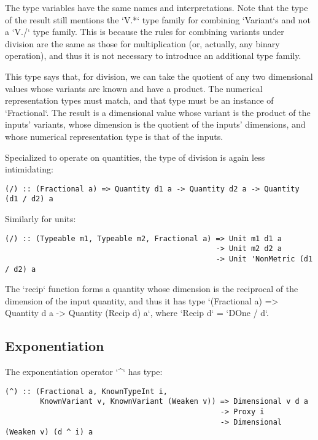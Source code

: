 \documentclass[11pt]{report}
\begin{document}
The type variables have the same names and interpretations. Note that the type of the result still mentions the
`V.*` type family for combining `Variant`s and not a `V./` type family. This is because the rules for combining variants
under division are the same as those for multiplication (or, actually, any binary operation), and thus it is not necessary
to introduce an additional type family.

This type says that, for division, we can take the quotient of any two dimensional values whose variants are known and have a product.
The numerical representation types must match, and that type must be an instance of `Fractional`. The result is a dimensional value
whose variant is the product of the inputs' variants, whose dimension is the quotient of the inputs' dimensions, and whose numerical representation
type is that of the inputs.

Specialized to operate on quantities, the type of division is again less intimidating:

\begin{lstlisting}
(/) :: (Fractional a) => Quantity d1 a -> Quantity d2 a -> Quantity (d1 / d2) a
\end{lstlisting}

Similarly for units:

\begin{lstlisting}
(/) :: (Typeable m1, Typeable m2, Fractional a) => Unit m1 d1 a
                                                -> Unit m2 d2 a
                                                -> Unit 'NonMetric (d1 / d2) a
\end{lstlisting}

The `recip` function forms a quantity whose dimension is the reciprocal of the dimension of the input quantity, and thus it has type
`(Fractional a) => Quantity d a -> Quantity (Recip d) a`, where `Recip d` = `DOne / d`. %

\subsection{Exponentiation}

The exponentiation operator `^` has type:

\begin{lstlisting}
(^) :: (Fractional a, KnownTypeInt i,
        KnownVariant v, KnownVariant (Weaken v)) => Dimensional v d a
                                                 -> Proxy i
                                                 -> Dimensional (Weaken v) (d ^ i) a
\end{lstlisting}
\end{document}
